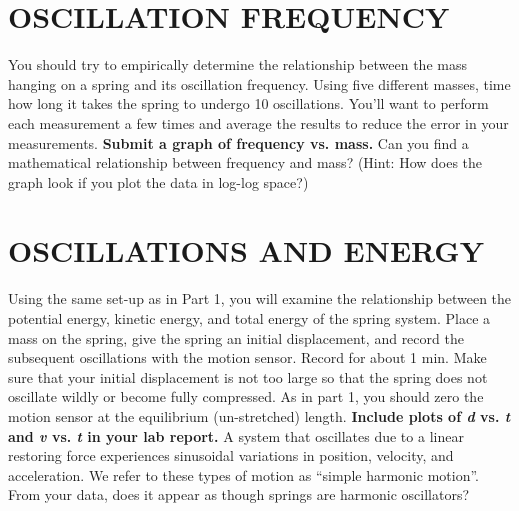 \documentclass[11pt,letterpaper]{article}
\begin{document}
\section{OSCILLATION FREQUENCY}
You should try to empirically determine the relationship between the mass hanging on a spring and its oscillation frequency. Using five different masses, time how long it takes the spring to undergo 10 oscillations. You'll want to perform each measurement a few times and average the results to reduce the error in your measurements. \textbf{Submit a graph of frequency vs. mass.} Can you find a mathematical relationship between frequency and mass? (Hint: How does the graph look if you plot the data in log-log space?)


\section{OSCILLATIONS AND ENERGY\label{sec:energy}}
Using the same set-up as in Part 1, you will examine the relationship between the
potential energy, kinetic energy, and total energy of the spring
system. Place a mass on the spring, give the spring an initial displacement, and record the subsequent oscillations with the motion sensor. Record for about 1 min. Make sure that your initial displacement is not too large so that the spring does not oscillate wildly or become fully compressed. As in part 1, you should zero the motion sensor at the equilibrium (un-stretched) length. \textbf{Include plots of \textit{d} vs. \textit{t} and \textit{v} vs. \textit{t} in your lab report.} A system that oscillates due to a linear restoring force experiences sinusoidal variations in position, velocity, and acceleration. We refer to these types of motion as ``simple harmonic motion''. From your data, does it appear as though springs are harmonic oscillators?
\end{document}
